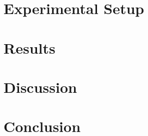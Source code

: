 \documentclass[conference]{IEEEtran}
\begin{document}
\section{Experimental Setup}

\section{Results}

\section{Discussion}

\section{Conclusion}



\end{document}
